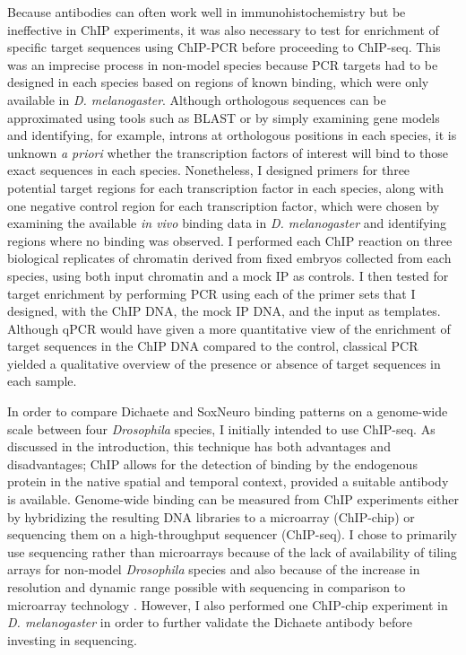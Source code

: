 Because antibodies can often work well in immunohistochemistry but be ineffective in ChIP experiments, it was also necessary to test for enrichment of specific target sequences using ChIP-PCR before proceeding to ChIP-seq. This was an imprecise process in non-model species because PCR targets had to be designed in each species based on regions of known binding, which were only available in \emph{D. melanogaster}. Although orthologous sequences can be approximated using tools such as BLAST \citep{altschul_basic_1990} or by simply examining gene models and identifying, for example, introns at orthologous positions in each species, it is unknown \emph{a priori} whether the transcription factors of interest will bind to those exact sequences in each species. Nonetheless, I designed primers for three potential target regions for each transcription factor in each species, along with one negative control region for each transcription factor, which were chosen by examining the available \emph{in vivo} binding data in \emph{D. melanogaster} and identifying regions where no binding was observed. I performed each ChIP reaction on three biological replicates of chromatin derived from fixed embryos collected from each species, using both input chromatin and a mock IP as controls. I then tested for target enrichment by performing PCR using each of the primer sets that I designed, with the ChIP DNA, the mock IP DNA, and the input as templates. Although qPCR would have given a more quantitative view of the enrichment of target sequences in the ChIP DNA compared to the control, classical PCR yielded a qualitative overview of the presence or absence of target sequences in each sample.

In order to compare Dichaete and SoxNeuro binding patterns on a genome-wide scale between four \emph{Drosophila} species, I initially intended to use ChIP-seq. As discussed in the introduction, this technique has both advantages and disadvantages; ChIP allows for the detection of binding by the endogenous protein in the native spatial and temporal context, provided a suitable antibody is available. Genome-wide binding can be measured from ChIP experiments either by hybridizing the resulting DNA libraries to a microarray (ChIP-chip) or sequencing them on a high-throughput sequencer (ChIP-seq). I chose to primarily use sequencing rather than microarrays because of the lack of availability of tiling arrays for non-model \emph{Drosophila} species and also because of the increase in resolution and dynamic range possible with sequencing in comparison to microarray technology \citep{aleksic_chiping_2009}. However, I also performed one ChIP-chip experiment in \emph{D. melanogaster} in order to further validate the Dichaete antibody before investing in sequencing.

